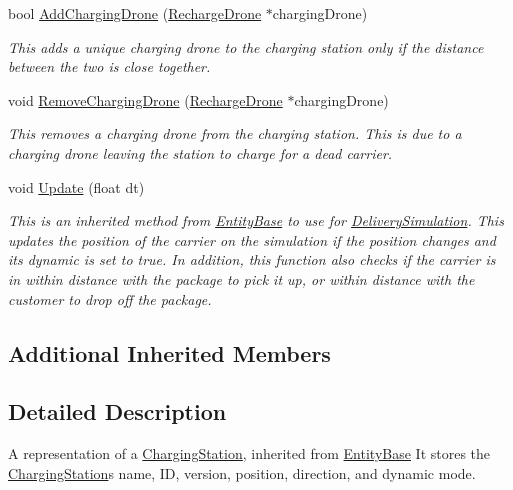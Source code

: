 \begin{DoxyCompactItemize}
bool \hyperlink{classcsci3081_1_1ChargingStation_a49703ccf92dd023e4be93b981d24904a}{Add\+Charging\+Drone} (\hyperlink{classcsci3081_1_1RechargeDrone}{Recharge\+Drone} $\ast$charging\+Drone)
\begin{DoxyCompactList}\small\item\em This adds a unique charging drone to the charging station only if the distance between the two is close together. \end{DoxyCompactList}\item 
void \hyperlink{classcsci3081_1_1ChargingStation_a10e78c7ca569a682b91498df6b5a9dd9}{Remove\+Charging\+Drone} (\hyperlink{classcsci3081_1_1RechargeDrone}{Recharge\+Drone} $\ast$charging\+Drone)
\begin{DoxyCompactList}\small\item\em This removes a charging drone from the charging station. This is due to a charging drone leaving the station to charge for a dead carrier. \end{DoxyCompactList}\item 
\mbox{\label{classcsci3081_1_1ChargingStation_a1c07341a14013ac118f7bfbc88f2a597}} 
void \hyperlink{classcsci3081_1_1ChargingStation_a1c07341a14013ac118f7bfbc88f2a597}{Update} (float dt)
\begin{DoxyCompactList}\small\item\em This is an inherited method from \hyperlink{classcsci3081_1_1EntityBase}{Entity\+Base} to use for \hyperlink{classcsci3081_1_1DeliverySimulation}{Delivery\+Simulation}. This updates the position of the carrier on the simulation if the position changes and its dynamic is set to true. In addition, this function also checks if the carrier is in within distance with the package to pick it up, or within distance with the customer to drop off the package. \end{DoxyCompactList}\end{DoxyCompactItemize}
\subsection*{Additional Inherited Members}


\subsection{Detailed Description}
A representation of a \hyperlink{classcsci3081_1_1ChargingStation}{Charging\+Station}, inherited from \hyperlink{classcsci3081_1_1EntityBase}{Entity\+Base} It stores the \hyperlink{classcsci3081_1_1ChargingStation}{Charging\+Station}\textquotesingle{}s name, ID, version, position, direction, and dynamic mode. 

